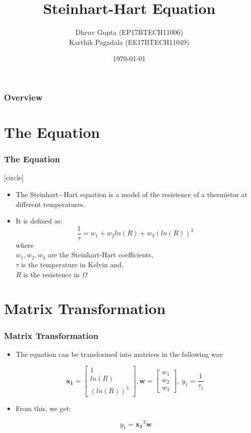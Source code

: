 \documentclass{beamer}
\title[Least Squares]{Steinhart-Hart Equation}
\author{Dhruv Gupta (EP17BTECH11006)\\Karthik Pagadala (EE17BTECH11049)}
\institute[IITH] 
{
Indian Institute Of Technology Hyderabad
}
\date{\today}
\let\vec\mathbf
\begin{document}
 
\begin{frame}
\titlepage
\end{frame}
 
\begin{frame}
\frametitle{Overview}
\tableofcontents 
\end{frame}

\section{The Equation}
 
\begin{frame}
\frametitle{The Equation}
[circle]

\begin{itemize}

\item The Steinhart$-$Hart equation is a model of the resistence of a thermistor at different temperatures. 

\item It is defined as:
      \[
      \frac{1}{\tau} = w_{1} + w_{2} ln(R) + w_{3} {(ln(R))}^{3}
      \] where \\ $w_{1},w_{2},w_{3}$ are the Steinhart-Hart coefficients, 
      \\ $\tau$ is the temperature in Kelvin and,
      \\ $R$ is the resistence in $\Omega$
\end{itemize}
\end{frame}

\section{Matrix Transformation}
\begin{frame}
\frametitle{Matrix Transformation}

\begin{itemize}
\item
The equation can be transformed into matrices in the following way

  \[  
  \vec{x_{1}}= \begin{bmatrix}1\\ln(R)\\{(ln(R))}^{3}\end{bmatrix} , 
  \vec{w}= \begin{bmatrix}w_{1}\\w_{2}\\w_{3}\end{bmatrix},
  \ y_{1} = \frac{1}{\tau_{1}}
  \]  
  
\item
From this, we get:

  \[
  \ y_{1} = \vec{x_{1}}^{T}\vec{w}
  \]
    

\end{itemize}
\end{frame} 
\end{document}
